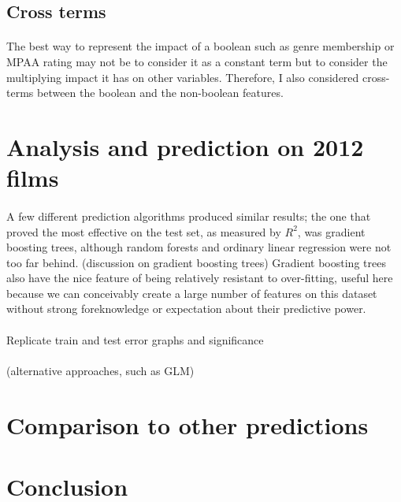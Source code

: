 \documentclass[10pt]{article}
\begin{document}
    \subsection{Cross terms}
    
    \paragraph{}
    The best way to represent the impact of a boolean such as genre membership or MPAA rating may not be to consider it as a constant term but to consider the multiplying impact it has on other variables. Therefore, I also considered cross-terms between the boolean and the non-boolean features. 
    
    \section{Analysis and prediction on 2012 films}
    
    \paragraph{}
    A few different prediction algorithms produced similar results; the one that proved the most effective on the test set, as measured by $R^2$, was gradient boosting trees, although random forests and ordinary linear regression were not too far behind. (discussion on gradient boosting trees) Gradient boosting trees also have the nice feature of being relatively resistant to over-fitting, useful here because we can conceivably create a large number of features on this dataset without strong foreknowledge or expectation about their predictive power. 
    
    \paragraph{}
    Replicate train and test error graphs and significance
    
    \paragraph{}
    (alternative approaches, such as GLM)
    
    \section{Comparison to other predictions}
    
    \section{Conclusion}
    
\end{document}
